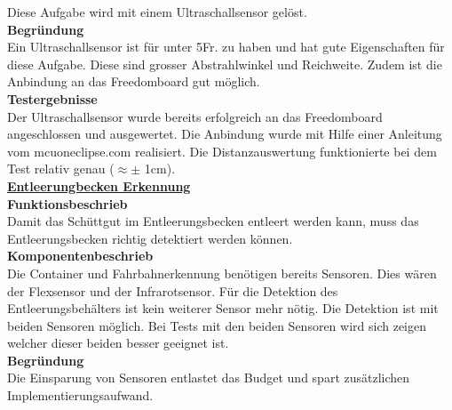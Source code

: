 \flushleft
Diese Aufgabe wird mit einem Ultraschallsensor gelöst. \\[0.2cm]
\textbf{Begründung}\\[0.2cm]
Ein Ultraschallsensor ist für unter 5Fr. zu haben und hat gute Eigenschaften für diese Aufgabe. Diese sind grosser Abstrahlwinkel und Reichweite.
Zudem ist die Anbindung an das Freedomboard gut möglich.\\[0.2cm]
\textbf{Testergebnisse}\\[0.2cm]
Der Ultraschallsensor wurde bereits erfolgreich an das Freedomboard angeschlossen und  ausgewertet. Die Anbindung wurde mit Hilfe einer Anleitung vom mcuoneclipse.com realisiert. Die Distanzauswertung funktionierte bei dem Test relativ genau ($\approx \pm $ 1cm).\\[0.2cm]
%
\underline{\textbf{Entleerungbecken Erkennung}} \\[0.2cm]
\textbf{Funktionsbeschrieb}\\[0.2cm]
Damit das Schüttgut im Entleerungsbecken entleert werden kann, muss das Entleerungsbecken richtig detektiert werden können. \\[0.2cm]
\textbf{Komponentenbeschrieb}\\[0.2cm]
Die Container und Fahrbahnerkennung benötigen bereits Sensoren. Dies wären der Flexsensor und der Infrarotsensor. Für die Detektion des Entleerungsbehälters ist kein weiterer Sensor mehr nötig. Die Detektion ist mit beiden Sensoren möglich. Bei Tests mit den beiden Sensoren wird sich zeigen welcher dieser beiden besser geeignet ist.\\[0.2cm]
\textbf{Begründung}\\[0.2cm]
Die Einsparung von Sensoren entlastet das Budget und spart zusätzlichen Implementierungsaufwand.\\[0.2cm]